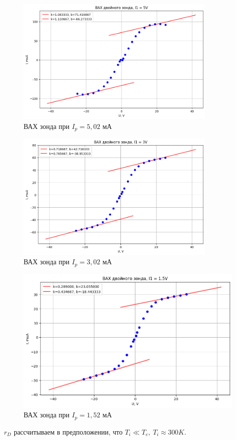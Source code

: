 \documentclass[a4paper, 12pt]{article}
\begin{document}
	\begin{figure}
		\centering
		\includegraphics[width = 0.87\textwidth, height = 0.45\textheight]{data/data2.png}
		\caption{ВАХ зонда при $I_p = 5,02$ мА}
	\end{figure}
	
	\begin{figure}
		\centering
		\includegraphics[width = 0.87\textwidth, height = 0.45\textheight]{data/data3.png}
		\caption{ВАХ зонда при $I_p = 3,02$ мА}
	\end{figure}
	
	\begin{figure}[h!]
		\centering
		\includegraphics[width = \textwidth]{data/data4}
		\caption{ВАХ зонда при $I_p = 1,52$ мА}
	\end{figure}
	\newpage
	$r_D$ рассчитываем в предположении, что $T_i \ll T_e, \ T_i \approx 300 K$.
	
\end{document}
